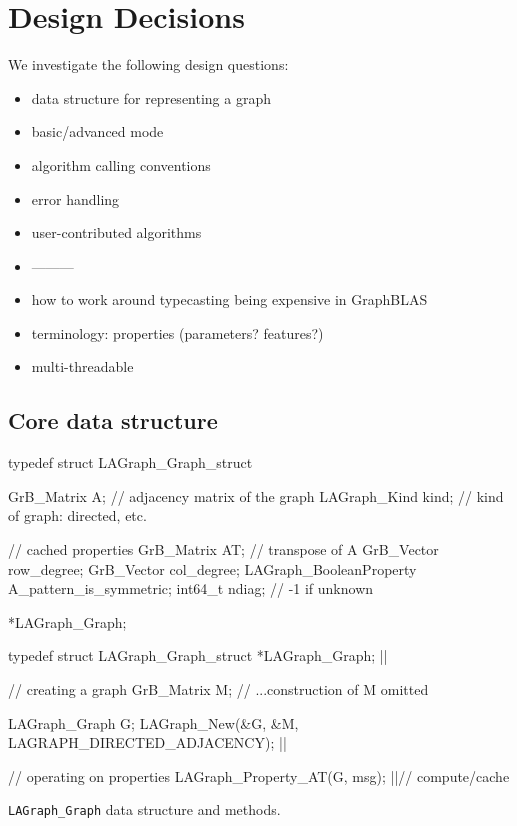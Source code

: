 \section{Design Decisions}
\label{sec:decisions}


We investigate the following design questions:

\begin{itemize}
    \item data structure for representing a graph
    \item basic/advanced mode
    \item algorithm calling conventions
    \item error handling
    \item user-contributed algorithms
    \item ---------
    \item how to work around typecasting being expensive in GraphBLAS
    \item terminology: properties (parameters? features?)
    \item multi-threadable
\end{itemize}


\subsection{Core data structure}

\begin{listing}
\begin{cplus}
typedef struct LAGraph_Graph_struct
{
    GrB_Matrix   A;      // adjacency matrix of the graph
    LAGraph_Kind kind;   // kind of graph: directed, etc.
    
    // cached properties
    GrB_Matrix   AT;     // transpose of A
    GrB_Vector   row_degree;
    GrB_Vector   col_degree;
    LAGraph_BooleanProperty A_pattern_is_symmetric;
    int64_t      ndiag;  // -1 if unknown
} *LAGraph_Graph;

typedef struct LAGraph_Graph_struct *LAGraph_Graph; |$\label{line:LAGraph_Graph}$|

// creating a graph
GrB_Matrix M;
// ...construction of M omitted

LAGraph_Graph G;
LAGraph_New(&G, &M, LAGRAPH_DIRECTED_ADJACENCY); |$\label{line:CreateGraphObject}$|

// operating on properties
LAGraph_Property_AT(G, msg);  |$\label{line:ComputeTranspose}$|// compute/cache
\end{cplus}
\caption{{\tt LAGraph\_Graph} data structure and methods.}
\label{Lst.graph}
\end{listing}

